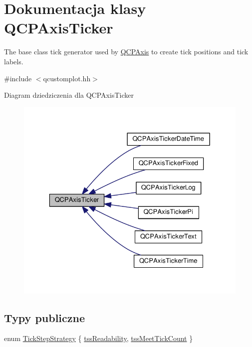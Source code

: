 \hypertarget{class_q_c_p_axis_ticker}{}\section{Dokumentacja klasy Q\+C\+P\+Axis\+Ticker}
\label{class_q_c_p_axis_ticker}


The base class tick generator used by \hyperlink{class_q_c_p_axis}{Q\+C\+P\+Axis} to create tick positions and tick labels.  




{\ttfamily \#include $<$qcustomplot.\+hh$>$}



Diagram dziedziczenia dla Q\+C\+P\+Axis\+Ticker\nopagebreak
\begin{figure}[H]
\begin{center}
\leavevmode
\includegraphics[width=329pt]{class_q_c_p_axis_ticker__inherit__graph}
\end{center}
\end{figure}
\subsection*{Typy publiczne}
\begin{DoxyCompactItemize}
\item 
enum \hyperlink{class_q_c_p_axis_ticker_ab6d2f9d9477821623ac9bc4b21ddf49a}{Tick\+Step\+Strategy} \{ \hyperlink{class_q_c_p_axis_ticker_ab6d2f9d9477821623ac9bc4b21ddf49aa9002aa2fd5633ab5556c71a26fed63a8}{tss\+Readability}, 
\hyperlink{class_q_c_p_axis_ticker_ab6d2f9d9477821623ac9bc4b21ddf49aa770312b6b9b0c64a37ceeba96e0cd7f2}{tss\+Meet\+Tick\+Count}
 \}
\end{DoxyCompactItemize}

